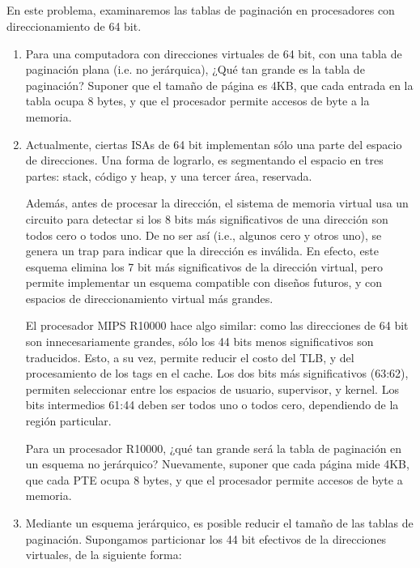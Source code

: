 \subsection{}

    En este problema, examinaremos las tablas de paginación en
    procesadores con direccionamiento de 64 bit.

    \begin{enumerate}
    \item	Para una computadora con direcciones virtuales de 64 bit,
	    con una tabla de paginación plana (i.e. no jerárquica),
	    ¿Qué tan grande es la tabla de paginación? Suponer que el
	    tamaño de página es 4KB, que cada entrada en la tabla 
	    ocupa 8 bytes, y que el procesador permite accesos de byte
	    a la memoria.

    \item	Actualmente, ciertas ISAs de 64 bit implementan sólo una
	    parte del espacio de direcciones. Una forma de lograrlo, es
	    segmentando el espacio en tres partes: stack, código y heap,
	    y una tercer área, reservada.

	    Además, antes de procesar la dirección, el sistema de memoria
	    virtual usa un circuito para detectar si los 8 bits más significativos de una
	    dirección son todos cero o todos uno. De no ser así­ (i.e.,
	    algunos cero y otros uno), se genera un trap para indicar que
	    la dirección es inválida. En efecto, este esquema elimina los
	    7 bit más significativos de la dirección virtual, pero permite
	    implementar un esquema compatible con diseños futuros, y con
	    espacios de direccionamiento virtual más grandes.

	    El procesador MIPS R10000 hace algo similar: como las 
	    direcciones de 64 bit son innecesariamente grandes, sólo los
	    44 bits menos significativos son traducidos. Esto, a su vez,
	    permite reducir el costo del TLB, y del procesamiento de los
	    tags en el cache. Los dos bits más significativos (63:62),
	    permiten seleccionar entre los espacios de usuario, supervisor,
	    y kernel. Los bits intermedios 61:44 deben ser todos uno o
	    todos cero, dependiendo de la región particular.

	    Para un procesador R10000, ¿qué tan grande será la tabla de
	    paginación en un esquema no jerárquico? Nuevamente, suponer que
	    cada página mide 4KB, que cada PTE ocupa 8 bytes, y que el
	    procesador permite accesos de byte a memoria.

    \item	Mediante un esquema jerárquico, es posible reducir el tamaño de
	    las tablas de paginación. Supongamos particionar los 44 bit
	    efectivos de la direcciones virtuales, de la siguiente forma:


\end{enumerate}
